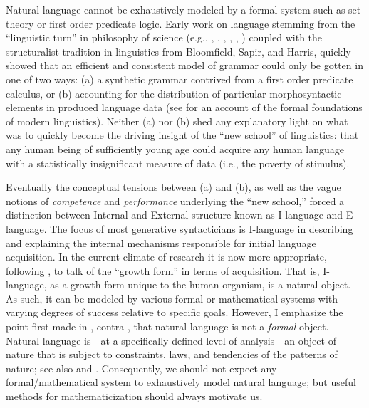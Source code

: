 \documentclass[11pt,twoside]{article}
\theoremstyle{plain}
\numberwithin{equation}{section}
\theoremstyle{definition}
\newtheorem{phrase string}{Phrase String}
\begin{document}
Natural language cannot be exhaustively modeled by a formal system such as set theory or first order predicate logic. Early work on language stemming from the ``linguistic turn'' in philosophy of science (e.g., \cite{ayer:1936}, \cite{carnap:1937}, \cite{riechenbach:1947}, \cite{tarski:1956}, \cite{popper:1959}, \cite{quine:1953}) coupled with the structuralist tradition in linguistics from Bloomfield, Sapir, and Harris, quickly showed that an efficient and consistent model of grammar could only be gotten in one of two ways: (a) a synthetic grammar contrived from a first order predicate calculus, or (b) accounting for the distribution of particular morphosyntactic elements in produced language data (see \cite{tomalin:2006} for an account of the formal foundations of modern linguistics). Neither (a) nor (b) shed any explanatory light on what was to quickly become the driving insight of the ``new school'' of linguistics: that any human being of sufficiently young age could acquire any human language with a statistically insignificant measure of data (i.e., the poverty of stimulus).
 
Eventually the conceptual tensions  between (a) and (b), as well as the vague notions of \emph{competence} and \emph{performance} underlying the ``new school,'' forced a distinction between Internal and External structure known as I-language and E-language. The focus of most generative syntacticians is I-language in describing and explaining the internal mechanisms responsible for initial language acquisition. In the current climate of research it is now more appropriate, following \cite{ppuriagereka:2008}, to talk of the ``growth form'' in terms of acquisition. That is, I-language, as a growth form unique to the human organism, is a natural object. As such, it can be modeled by various formal or mathematical systems with varying degrees of success relative to specific goals. However, I emphasize the point first made in \cite{chomsky55logicalsyntax}, contra \cite{barhillel:1954}, that natural language is not a \emph{formal} object. Natural language is---at a specifically defined level of analysis---an object of nature that is subject to constraints, laws, and tendencies of the patterns of nature; see also \cite{chomsky95langnature} and \cite{boeckxpp:2005}. Consequently, we should not expect any formal/mathematical system to exhaustively model natural language; but useful methods for mathematicization should always motivate us.
\end{document}
